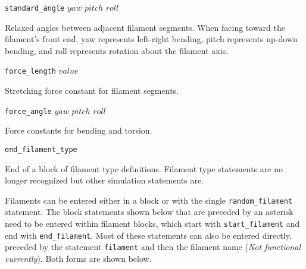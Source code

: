\documentclass {scrbook}
\newcommand {\ttt} {\texttt}
\begin{document}
\begin{description}
\item{\ttt{standard\_angle} $yaw$ $pitch$ $roll$}

Relaxed angles between adjacent filament segments. When facing toward the filament's front end, yaw represents left-right bending, pitch represents up-down bending, and roll represents rotation about the filament axis.

\item{\ttt{force\_length} $value$}

Stretching force constant for filament segments.

\item{\ttt{force\_angle} $yaw$ $pitch$ $roll$}

Force constants for bending and torsion.

\item{\ttt{end\_filament\_type}}

End of a block of filament type definitions. Filament type statements are no longer recognized but other simulation statements are.

\end{description}

Filaments can be entered either in a block or with the single \ttt{random\_filament} statement. The block statements shown below that are preceded by an asterisk need to be entered within filament blocks, which start with \ttt{start\_filament} and end with \ttt{end\_filament}. Most of these statements can also be entered directly, preceded by the statement \ttt{filament} and then the filament name (\textit{Not functional currently}). Both forms are shown below.
\end{document}
